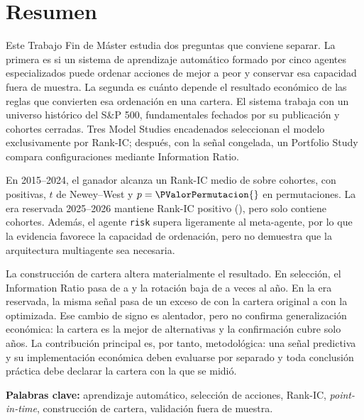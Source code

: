 \chapter*{Resumen}

Este Trabajo Fin de Máster estudia dos preguntas que conviene separar. La primera es si un sistema
de aprendizaje automático formado por cinco agentes especializados puede ordenar acciones de mejor
a peor y conservar esa capacidad fuera de muestra. La segunda es cuánto depende el resultado
económico de las reglas que convierten esa ordenación en una cartera. El sistema trabaja con un
universo histórico del S\&P 500, fundamentales fechados por su publicación y cohortes cerradas. Tres
Model Studies encadenados seleccionan el modelo exclusivamente por Rank-IC; después, con la señal
congelada, un Portfolio Study compara \NumCarteras{} configuraciones mediante Information Ratio.

En 2015--2024, el ganador alcanza un Rank-IC medio de \RankICSeleccion{} sobre
\CohortesSeleccion{} cohortes, con \FraccionICPositiva{} positivas, $t$ de Newey--West
\TNeweyWest{} y $p=\PValorPermutacion{}$ en \NumPermutaciones{} permutaciones. La era reservada
2025--2026 mantiene Rank-IC positivo (\RankICReservado{}), pero solo contiene
\CohortesReservadas{} cohortes. Además, el agente \texttt{risk} supera ligeramente al meta-agente,
por lo que la evidencia favorece la capacidad de ordenación, pero no demuestra que la arquitectura
multiagente sea necesaria.

La construcción de cartera altera materialmente el resultado. En selección, el Information Ratio
pasa de \IRModelo{} a \IRCartera{} y la rotación baja de \TurnoverModelo{} a
\TurnoverCartera{} veces al año. En la era reservada, la misma señal pasa de un exceso de
\ExcesoModeloReservado{} con la cartera original a \ExcesoCarteraReservado{} con la optimizada.
Ese cambio de signo es alentador, pero no confirma generalización económica: la cartera es la mejor
de \NumCarteras{} alternativas y la confirmación cubre solo \AnosCarteraReservada{} años. La
contribución principal es, por tanto, metodológica: una señal predictiva y su implementación
económica deben evaluarse por separado y toda conclusión práctica debe declarar la cartera con la
que se midió.

\noindent\textbf{Palabras clave:} aprendizaje automático, selección de acciones, Rank-IC,
\textit{point-in-time}, construcción de cartera, validación fuera de muestra.

\clearpage
